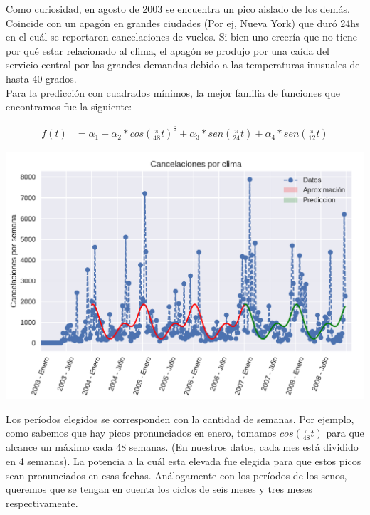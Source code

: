 Como curiosidad, en agosto de 2003 se encuentra un pico aislado de los demás. Coincide con un apagón en grandes ciudades (Por ej, Nueva York) que duró 24hs en el cuál se reportaron cancelaciones de vuelos. Si bien uno creería que no tiene por qué estar relacionado al clima, el apagón se produjo por una caída del servicio central por las grandes demandas debido a las temperaturas inusuales de hasta 40 grados. \cite{ApagonNewYork} \\

Para la predicción con cuadrados mínimos, la mejor familia de funciones que encontramos fue la siguiente:

\begin{align}
f(t) &= \alpha_1 + \alpha_2 * cos(\frac{\pi}{48} t)^{8} + \alpha_3 * sen(\frac{\pi}{24} t) + \alpha_4 * sen(\frac{\pi}{12} t)
\end{align}

{\centering
    \includegraphics[scale=0.8]{informe/imagenes/cancelacionesPorClimaGeneralPrediccionV1.pdf} \\
}

Los períodos elegidos se corresponden con la cantidad de semanas. Por ejemplo, como sabemos que hay picos pronunciados en enero, tomamos $cos(\frac{\pi}{48} t)$ para que alcance un máximo cada 48 semanas. (En nuestros datos, cada mes está dividido en 4 semanas). La potencia a la cuál esta elevada fue elegida para que estos picos sean pronunciados en esas fechas. Análogamente con los períodos de los senos, queremos que se tengan en cuenta los ciclos de seis meses y tres meses respectivamente. \\

